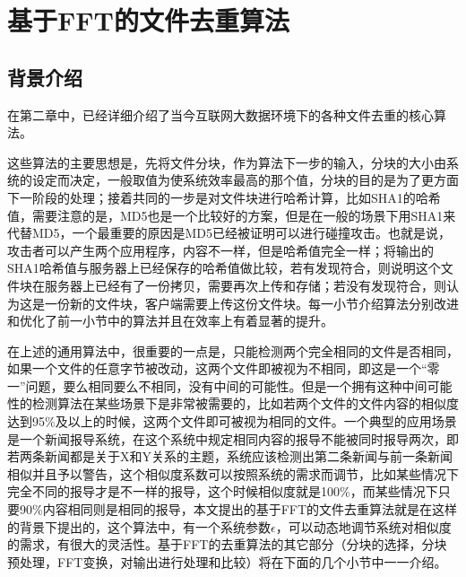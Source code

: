 


\chapter{基于FFT的文件去重算法}
\label{chap:algo}

\section{背景介绍}
\label{sec:back}

在第二章中，已经详细介绍了当今互联网大数据环境下的各种文件去重的核心算法。

这些算法的主要思想是，先将文件分块，作为算法下一步的输入，分块的大小由系统的设定而决定，一般取值为使系统效率最高的那个值，分块的目的是为了更方面下一阶段的处理；接着共同的一步是对文件块进行哈希计算，比如SHA1的哈希值，需要注意的是，MD5也是一个比较好的方案，但是在一般的场景下用SHA1来代替MD5，一个最重要的原因是MD5已经被证明可以进行碰撞攻击。也就是说，攻击者可以产生两个应用程序，内容不一样，但是哈希值完全一样；将输出的SHA1哈希值与服务器上已经保存的哈希值做比较，若有发现符合，则说明这个文件块在服务器上已经有了一份拷贝，需要再次上传和存储；若没有发现符合，则认为这是一份新的文件块，客户端需要上传这份文件块。每一小节介绍算法分别改进和优化了前一小节中的算法并且在效率上有着显著的提升。

在上述的通用算法中，很重要的一点是，只能检测两个完全相同的文件是否相同，如果一个文件的任意字节被改动，这两个文件即被视为不相同，即这是一个“零一”问题，要么相同要么不相同，没有中间的可能性。但是一个拥有这种中间可能性的检测算法在某些场景下是非常被需要的，比如若两个文件的文件内容的相似度达到95\%及以上的时候，这两个文件即可被视为相同的文件。一个典型的应用场景是一个新闻报导系统，在这个系统中规定相同内容的报导不能被同时报导两次，即若两条新闻都是关于X和Y关系的主题，系统应该检测出第二条新闻与前一条新闻相似并且予以警告，这个相似度系数可以按照系统的需求而调节，比如某些情况下完全不同的报导才是不一样的报导，这个时候相似度就是100\%，而某些情况下只要90\%内容相同则是相同的报导，本文提出的基于FFT的文件去重算法就是在这样的背景下提出的，这个算法中，有一个系统参数$\epsilon$，可以动态地调节系统对相似度的需求，有很大的灵活性。基于FFT的去重算法的其它部分（分块的选择，分块预处理，FFT变换，对输出进行处理和比较）将在下面的几个小节中一一介绍。

